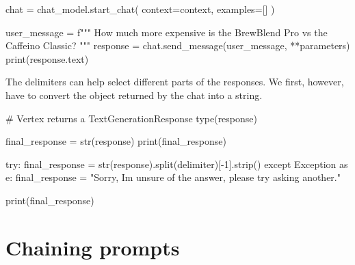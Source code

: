 \documentclass[
  letterpaper,
  DIV=11,
  numbers=noendperiod]{scrreprt}
\newenvironment{Shaded}{\begin{snugshade}}{\end{snugshade}}
\newcommand{\BuiltInTok}[1]{\textcolor[rgb]{0.00,0.23,0.31}{#1}}
\newcommand{\CommentTok}[1]{\textcolor[rgb]{0.37,0.37,0.37}{#1}}
\newcommand{\ControlFlowTok}[1]{\textcolor[rgb]{0.00,0.23,0.31}{#1}}
\newcommand{\DecValTok}[1]{\textcolor[rgb]{0.68,0.00,0.00}{#1}}
\newcommand{\ImportTok}[1]{\textcolor[rgb]{0.00,0.46,0.62}{#1}}
\newcommand{\NormalTok}[1]{\textcolor[rgb]{0.00,0.23,0.31}{#1}}
\newcommand{\OperatorTok}[1]{\textcolor[rgb]{0.37,0.37,0.37}{#1}}
\newcommand{\PreprocessorTok}[1]{\textcolor[rgb]{0.68,0.00,0.00}{#1}}
\newcommand{\SpecialStringTok}[1]{\textcolor[rgb]{0.13,0.47,0.30}{#1}}
\newcommand{\StringTok}[1]{\textcolor[rgb]{0.13,0.47,0.30}{#1}}
\begin{document}
\begin{Shaded}
\begin{Highlighting}[]
\NormalTok{chat }\OperatorTok{=}\NormalTok{ chat\_model.start\_chat(}
\NormalTok{    context}\OperatorTok{=}\NormalTok{context,}
\NormalTok{    examples}\OperatorTok{=}\NormalTok{[]}
\NormalTok{)}

\NormalTok{user\_message }\OperatorTok{=} \SpecialStringTok{f"""}
\SpecialStringTok{How much more expensive is the BrewBlend Pro vs the Caffeino Classic?}
\SpecialStringTok{"""}
\NormalTok{response }\OperatorTok{=}\NormalTok{ chat.send\_message(user\_message, }\OperatorTok{**}\NormalTok{parameters)}
\BuiltInTok{print}\NormalTok{(response.text)}
\end{Highlighting}
\end{Shaded}

The delimiters can help select different parts of the responses. We
first, however, have to convert the object returned by the chat into a
string.

\begin{Shaded}
\begin{Highlighting}[]
\CommentTok{\# Vertex returns a TextGenerationResponse}
\BuiltInTok{type}\NormalTok{(response)}
\end{Highlighting}
\end{Shaded}

\begin{Shaded}
\begin{Highlighting}[]
\NormalTok{final\_response }\OperatorTok{=} \BuiltInTok{str}\NormalTok{(response)}
\BuiltInTok{print}\NormalTok{(final\_response)}
\end{Highlighting}
\end{Shaded}

\begin{Shaded}
\begin{Highlighting}[]
\ControlFlowTok{try}\NormalTok{:}
\NormalTok{    final\_response }\OperatorTok{=} \BuiltInTok{str}\NormalTok{(response).split(delimiter)[}\OperatorTok{{-}}\DecValTok{1}\NormalTok{].strip()}
\ControlFlowTok{except} \PreprocessorTok{Exception} \ImportTok{as}\NormalTok{ e:}
\NormalTok{    final\_response }\OperatorTok{=} \StringTok{"Sorry, I\textquotesingle{}m unsure of the answer, please try asking another."}

\BuiltInTok{print}\NormalTok{(final\_response)}
\end{Highlighting}
\end{Shaded}

\hypertarget{chaining-prompts}{%
\chapter{Chaining prompts}\label{chaining-prompts}}
\end{document}
